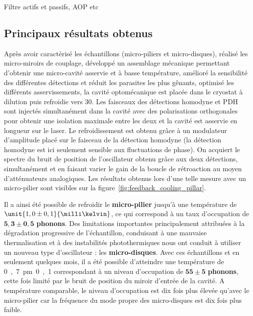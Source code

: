 \documentclass[12pt,a4paper]{article}
\begin{document}
Filtre actifs et passifs, AOP etc

\subsection{Principaux résultats obtenus}

Après avoir caractérisé les échantillons (micro-piliers et micro-disques), réalisé les micro-miroirs de couplage, développé un assemblage mécanique permettant d'obtenir une micro-cavité asservie et à basse température, amélioré la sensibilité des différentes détections et réduit les parasites les plus gênants, optimisé les différents asservissements, la cavité optomécanique est placée dans le cryostat à dilution puis refroidie vers \unit{30}{\milli\kelvin}.
Les faisceaux des détections homodyne et PDH sont injectés simultanément dans la cavité avec des polarisations orthogonales pour obtenir une isolation maximale entre les deux et la cavité est asservie en longueur sur le laser.
Le refroidissement est obtenu grâce à un modulateur d'amplitude placé sur le faisceau de la détection homodyne (la détection homodyne est ici seulement sensible aux fluctuations de phase).
On acquiert le spectre du bruit de position de l'oscillateur obtenu grâce aux deux détections, simultanément et en faisant varier le gain de la boucle de rétroaction au moyen d'atténuateurs analogiques.
Les résultats obtenus lors d'une telle mesure avec un micro-pilier sont visibles sur la figure~\ref{fig:feedback_cooling_pillar}.

Il a ainsi été possible de refroidir le \textbf{micro-pilier} jusqu'à une température de $\unit{1,0\pm 0,1}{\milli\kelvin}$, ce qui correspond à un taux d'occupation de $\mathbf{5,3 \pm 0,5}$ \textbf{phonons}.
Des limitations importantes principalement attribuées à la dégradation progressive de l'échantillon, conduisant à une mauvaise thermalisation et à des instabilités photothermiques nous ont conduit à utiliser un nouveau type d'oscillateur : les \textbf{micro-disques}.
Avec ces échantillons et en seulement quelques mois, il a été possible d'atteindre une température de \unit{0,7\pm 0,1}{\milli\kelvin} correspondant à un niveau d'occupation de $\mathbf{55\pm5}$ \textbf{phonons}, cette fois limité par le bruit de position du miroir d'entrée de la cavité.
A température comparable, le niveau d'occupation est dix fois plus élevée qu'avec le micro-pilier car la fréquence du mode propre des micro-disques est dix fois plus faible. 
\end{document}
